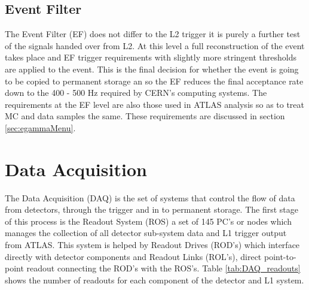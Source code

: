 

	\subsection*{Event Filter}
		The Event Filter (EF) does not differ to the L2 trigger it is purely a further test of the signals handed over from L2. At this level a full reconstruction of the event takes place and EF trigger requirements with slightly more stringent thresholds are applied to the event. This is the final decision for whether the event is going to be copied to permanent storage an so the EF reduces the final acceptance rate down to the 400 - 500 Hz required by CERN's computing systems. The requirements at the EF level are also those used in ATLAS analysis so as to treat MC and data samples the same. These requirements are discussed in section \ref{sec:egammaMenu}.
	



\section{Data Acquisition}
\label{sec:trig_DAQ}

	The Data Acquisition (DAQ) is the set of systems that control the flow of data from detectors, through the trigger and in to permanent storage. The first stage of this process is the Readout System (ROS) a set of 145 PC's or nodes which manages the collection of all detector sub-system data and L1 trigger output from ATLAS. This system is helped by Readout Drives (ROD's) which interface directly with detector components and Readout Links (ROL's), direct point-to-point readout connecting the ROD's with the ROS's. Table \ref{tab:DAQ_readouts} shows the number of readouts for each component of the detector and L1 system.



